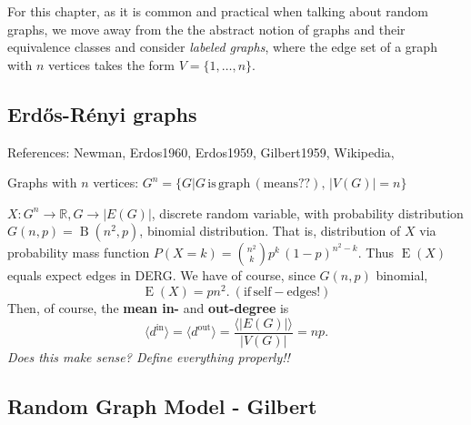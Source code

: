 For this chapter, as it is common and practical when talking about
random graphs, we move away from the the abstract notion of graphs and
their equivalence classes and consider \textit{labeled graphs}, where
the edge set of a graph with $n$ vertices takes the form $V =
\{1,\ldots,n\}$.




\subsection{Erd\H{o}s-R\'{e}nyi graphs}

References: Newman, Erdos1960, Erdos1959, Gilbert1959, 
Wikipedia, \parencite{West_Graph-theory}
		
		
\begin{definition}
  Graphs with $n$ vertices: $G^n = \{G| G\,\mathrm{is\,
    graph\,(means??)},\, |V(G)| = n\}$
\end{definition}
		
\begin{remark}
  $X: G^n \to \mathbb{R}, G \to |E(G)|$, discrete random variable,
  with probability distribution $G(n,p) =\operatorname{B}(n^2,p)$,
  binomial distribution. That is, distribution of $X$ via probability
  mass function $P(X=k) = {{n^2} \choose k} p^k\,(1-p)^{n^2-k}$. Thus
  $\operatorname{E}(X)$ equals expect edges in DERG. We have of
  course, since $G(n,p)$ binomial,
  \[
  \operatorname{E}(X) = pn^2. \mathrm{\:(if\,self-edges!)}
  \]
  Then, of course, the \textbf{mean in-}  and \textbf{out-degree} is \[ \langle
  d^{\mathrm{in}} \rangle = \langle d^{\mathrm{out}} \rangle =
  \frac{\langle |E(G)| \rangle}{|V(G)|} = np.\] \textit{Does this make
    sense? Define everything properly!!}
\end{remark}

\subsection{Random Graph Model - Gilbert}\label{sec:gilbert_graph}



% 





